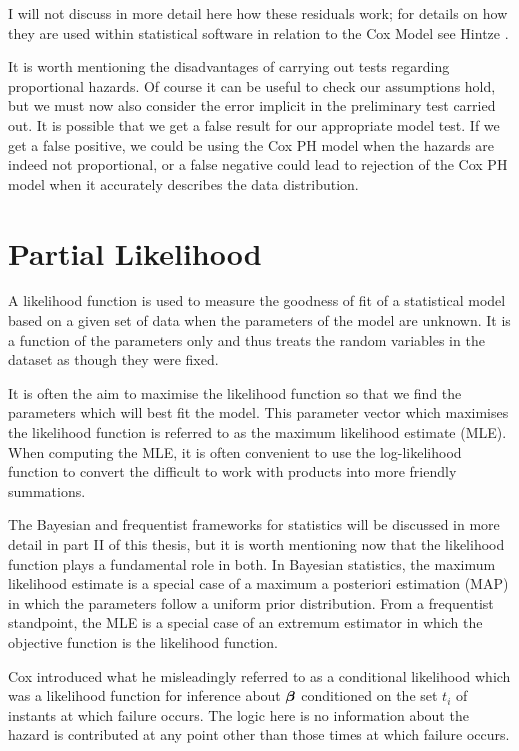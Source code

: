 I will not discuss in more detail here how these residuals work; for details on how they are used within statistical software in relation to the Cox Model see Hintze .

It is worth mentioning the disadvantages of carrying out tests regarding proportional hazards. Of course it can be useful to check our assumptions hold, but we must now also consider the error implicit in the preliminary test carried out. It is possible that we get a false result for our appropriate model test. If we get a false positive, we could be using the Cox PH model when the hazards are indeed not proportional, or a false negative could lead to rejection of the Cox PH model when it accurately describes the data distribution.

\section{Partial Likelihood}\label{sec:partial-likelihood}

A likelihood function is used to measure the goodness of fit of a statistical model based on a given set of data when the parameters of the model are unknown. It is a function of the parameters only and thus treats the random variables in the dataset as though they were fixed.

It is often the aim to maximise the likelihood function so that we find the parameters which will best fit the model. This parameter vector which maximises the likelihood function is referred to as the maximum likelihood estimate (MLE). When computing the MLE, it is often convenient to use the log-likelihood function to convert the difficult to work with products into more friendly summations.

The Bayesian and frequentist frameworks for statistics will be discussed in more detail in part II of this thesis, but it is worth mentioning now that the likelihood function plays a fundamental role in both. In Bayesian statistics, the maximum likelihood estimate is a special case of a maximum a posteriori estimation (MAP) in which the parameters follow a uniform prior distribution. From a frequentist standpoint, the MLE is a special case of an extremum estimator in which the objective function is the likelihood function.

Cox  introduced what he misleadingly referred to as a conditional likelihood which was a likelihood function for inference about $\boldsymbol{\beta}$ conditioned on the set ${t_i}$ of instants at which failure occurs. The logic here is no information about the hazard is contributed at any point other than those times at which failure occurs. 

